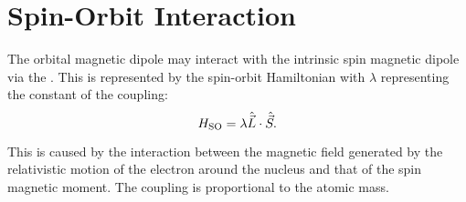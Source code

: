 \section{Spin-Orbit Interaction}
The orbital magnetic dipole may interact with the intrinsic spin magnetic dipole via the . This is represented by the spin-orbit Hamiltonian with $\lambda$ representing the constant of the coupling: 
\begin{equation}
    H_{\ce{SO}} = \lambda \hat{\vec{L}}\cdot\hat{\vec{S}}. 
    \label{eq:spin_orbit_hamiltonian}
\end{equation}

This is caused by the interaction between the magnetic field generated by the relativistic motion of the electron around the nucleus and that of the spin magnetic moment. The coupling is proportional to the atomic mass. 

